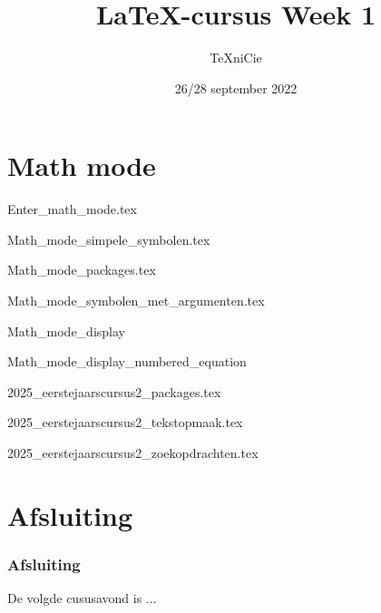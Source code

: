 \documentclass[allauthors,dutch]{../../cursuspresentatie}
\title{\LaTeX{}-cursus Week 1}
\author{\TeX niCie}
\date{26/28 september 2022}
\def\importslide#1#2{%
	{#2}
}
\def\importslidej#1#2{%
	{#2}
}
\begin{document}
\section{Math mode}

\importslide{2025-eerstejaars_cursus_1}{Enter_math_mode.tex}
\importslide{2025-eerstejaars_cursus_1}{Math_mode_simpele_symbolen.tex}
\importslide{2025-eerstejaars_cursus_1}{Math_mode_packages.tex}
\importslide{2025-eerstejaars_cursus_1}{Math_mode_symbolen_met_argumenten.tex}
\importslide{2025-eerstejaars_cursus_1}{Math_mode_display}
\importslide{2025-eerstejaars_cursus_1}{Math_mode_display_numbered_equation}

\importslidej{cursus2}{2025_eerstejaarscursus2_packages.tex}
\importslidej{cursus2}{2025_eerstejaarscursus2_tekstopmaak.tex}
\importslidej{cursus2}{2025_eerstejaarscursus2_zoekopdrachten.tex}

\section{Afsluiting}
\begin{frame}
	\frametitle{Afsluiting}
	
	De volgde cususavond is ...
\end{frame}
	
\end{document}
